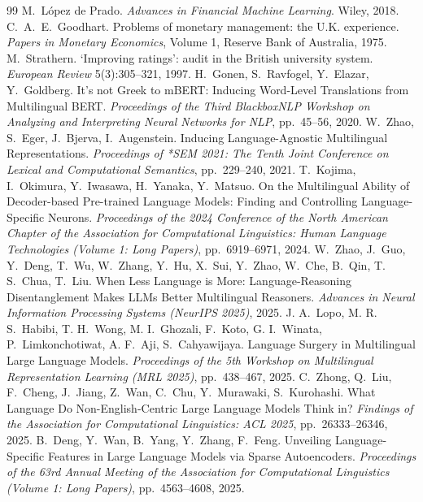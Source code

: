 \documentclass[11pt,a4paper]{article}
\begin{document}
\begin{thebibliography}{99}
M.~L\'opez de Prado. \emph{Advances in Financial Machine Learning}. Wiley,
2018.
C.~A.~E.~Goodhart. Problems of monetary management: the U.K. experience.
\emph{Papers in Monetary Economics}, Volume 1, Reserve Bank of Australia,
1975.
M.~Strathern. `Improving ratings': audit in the British university system.
\emph{European Review} 5(3):305--321, 1997.
H.~Gonen, S.~Ravfogel, Y.~Elazar, Y.~Goldberg. It's not Greek to mBERT: Inducing Word-Level Translations from Multilingual BERT. \emph{Proceedings of the Third BlackboxNLP Workshop on Analyzing and Interpreting Neural Networks for NLP}, pp.~45--56, 2020.
W.~Zhao, S.~Eger, J.~Bjerva, I.~Augenstein. Inducing Language-Agnostic Multilingual Representations. \emph{Proceedings of *SEM 2021: The Tenth Joint Conference on Lexical and Computational Semantics}, pp.~229--240, 2021.
T.~Kojima, I.~Okimura, Y.~Iwasawa, H.~Yanaka, Y.~Matsuo. On the Multilingual Ability of Decoder-based Pre-trained Language Models: Finding and Controlling Language-Specific Neurons. \emph{Proceedings of the 2024 Conference of the North American Chapter of the Association for Computational Linguistics: Human Language Technologies (Volume 1: Long Papers)}, pp.~6919--6971, 2024.
W.~Zhao, J.~Guo, Y.~Deng, T.~Wu, W.~Zhang, Y.~Hu, X.~Sui, Y.~Zhao, W.~Che, B.~Qin, T. S.~Chua, T.~Liu. When Less Language is More: Language-Reasoning Disentanglement Makes LLMs Better Multilingual Reasoners. \emph{Advances in Neural Information Processing Systems (NeurIPS 2025)}, 2025.
J. A.~Lopo, M. R. S.~Habibi, T. H.~Wong, M. I.~Ghozali, F.~Koto, G. I.~Winata, P.~Limkonchotiwat, A. F.~Aji, S.~Cahyawijaya. Language Surgery in Multilingual Large Language Models. \emph{Proceedings of the 5th Workshop on Multilingual Representation Learning (MRL 2025)}, pp.~438--467, 2025.
C.~Zhong, Q.~Liu, F.~Cheng, J.~Jiang, Z.~Wan, C.~Chu, Y.~Murawaki, S.~Kurohashi. What Language Do Non-English-Centric Large Language Models Think in? \emph{Findings of the Association for Computational Linguistics: ACL 2025}, pp.~26333--26346, 2025.
B.~Deng, Y.~Wan, B.~Yang, Y.~Zhang, F.~Feng. Unveiling Language-Specific Features in Large Language Models via Sparse Autoencoders. \emph{Proceedings of the 63rd Annual Meeting of the Association for Computational Linguistics (Volume 1: Long Papers)}, pp.~4563--4608, 2025.

\end{thebibliography}
\end{document}
